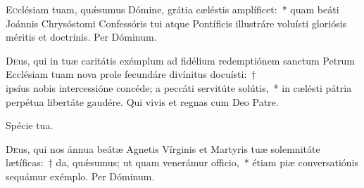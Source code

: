 \documentclass[vesperale_romanum.tex]{subfiles}
\begin{document}

\oratio

\lettrine{E}{c}clésiam tuam, quǽsumus Dómine, grátia cæléstis amplíficet:~* quam beáti Joánnis Chrysóstomi Confessóris tui atque Pontíficis illustráre voluísti gloriósis méritis et doctrínis. Per Dóminum.



\myrule



\duplexmtv


\oratio

 \lettrine{D}{e}us, qui in tuæ caritátis exémplum ad fidélium redemptiónem sanctum Petrum Ecclésiam tuam nova prole fecundáre divínitus docuísti:~† \\ ipsíus nobis intercessióne concéde; a peccáti servitúte solútis,~* in cælésti pátria perpétua libertáte gaudére.
Qui vivis et regnas cum Deo Patre.






\vv Spécie tua.

\oratio

 \lettrine{D}{e}us, qui nos ánnua beátæ Agnetis Vírginis et Martyris tuæ solemnitáte lætíficas:~† da, quǽsumus; ut quam venerámur officio,~* étiam piæ conversatiónis sequámur exémplo.
Per Dóminum.
\end{document}
